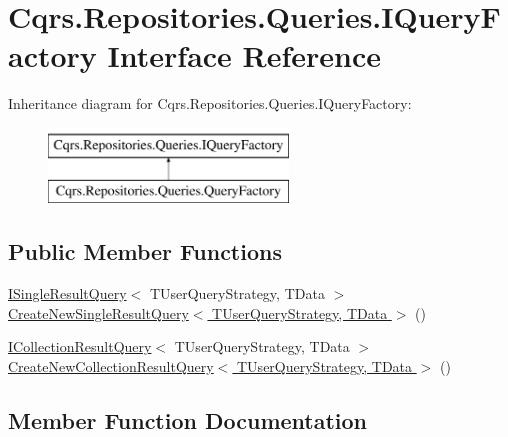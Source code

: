 \hypertarget{interfaceCqrs_1_1Repositories_1_1Queries_1_1IQueryFactory}{}\section{Cqrs.\+Repositories.\+Queries.\+I\+Query\+Factory Interface Reference}
\label{interfaceCqrs_1_1Repositories_1_1Queries_1_1IQueryFactory}
Inheritance diagram for Cqrs.\+Repositories.\+Queries.\+I\+Query\+Factory\+:\begin{figure}[H]
\begin{center}
\leavevmode
\includegraphics[height=2.000000cm]{interfaceCqrs_1_1Repositories_1_1Queries_1_1IQueryFactory}
\end{center}
\end{figure}
\subsection*{Public Member Functions}
\begin{DoxyCompactItemize}
\item 
\hyperlink{interfaceCqrs_1_1Repositories_1_1Queries_1_1ISingleResultQuery}{I\+Single\+Result\+Query}$<$ T\+User\+Query\+Strategy, T\+Data $>$ \hyperlink{interfaceCqrs_1_1Repositories_1_1Queries_1_1IQueryFactory_a237aee0f99d8bfc03d8f10595f16ecea}{Create\+New\+Single\+Result\+Query$<$ T\+User\+Query\+Strategy, T\+Data $>$} ()
\item 
\hyperlink{interfaceCqrs_1_1Repositories_1_1Queries_1_1ICollectionResultQuery}{I\+Collection\+Result\+Query}$<$ T\+User\+Query\+Strategy, T\+Data $>$ \hyperlink{interfaceCqrs_1_1Repositories_1_1Queries_1_1IQueryFactory_af8b443851e8112dc70cbc7fe32029ccb}{Create\+New\+Collection\+Result\+Query$<$ T\+User\+Query\+Strategy, T\+Data $>$} ()
\end{DoxyCompactItemize}


\subsection{Member Function Documentation}
\mbox{\label{interfaceCqrs_1_1Repositories_1_1Queries_1_1IQueryFactory_af8b443851e8112dc70cbc7fe32029ccb}} 
